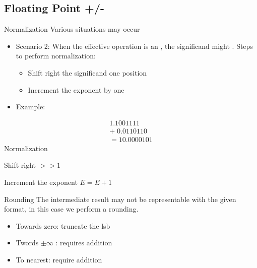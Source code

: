 \subsection{Floating Point +/-}
\begin{parag}{Normalization}
    Various situations may occur
    \begin{itemize}
        \item Scenario 2: When the effective operation is an , the significand might . Steps to perform normalization:
            \begin{itemize}
                \item Shift right the significand one position
                \item Increment the exponent by one
            \end{itemize}
        \item Example:
    \end{itemize}
    \begin{align*}
        1.1001111\\
        + \; 0.0110110 \\
        = 10.0000101
    \end{align*}
    Normalization 
    \begin{enumarate}
    \item Shift right $>> 1$
    \item Increment the exponent $E = E + 1$
    \end{enumarate}

    

\end{parag}




\begin{parag}{Rounding}
    The intermediate result may not be representable with the given format, in this case we perform a rounding.
    \begin{itemize}
        \item Towards zero: truncate the lsb
        \item Twords $ \pm \infty$ : requires addition
        \item To nearest: require addition
    \end{itemize}

\end{parag}


